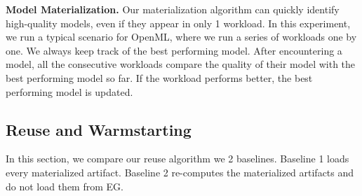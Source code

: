 \textbf{Model Materialization. }
Our materialization algorithm can quickly identify high-quality models, even if they appear in only 1 workload.
In this experiment, we run a typical scenario for OpenML, where we run a series of workloads one by one.
We always keep track of the best performing model.
After encountering a model, all the consecutive workloads compare the quality of their model with the best performing model so far.
If the workload performs better, the best performing model is updated.
\subsection{Reuse and Warmstarting}
In this section, we compare our reuse algorithm we 2 baselines.
Baseline 1 loads every materialized artifact.
Baseline 2 re-computes the materialized artifacts and do not load them from EG.

